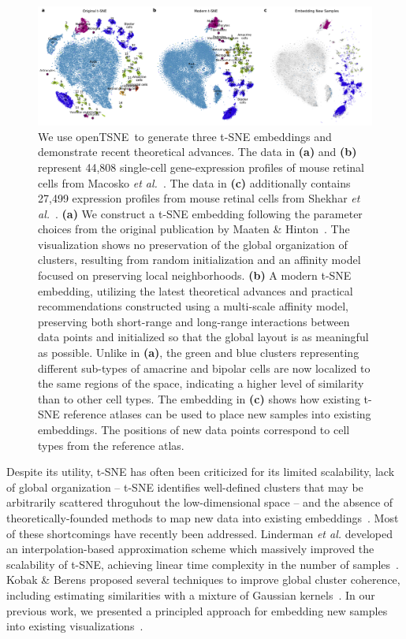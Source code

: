\documentclass[letter]{article}
\newcommand{\opentsne}{\textsf{openTSNE}}
\begin{document}
\begin{figure}[htbp]
  \includegraphics[width=\textwidth]{macosko2015}
  \caption{\label{fig:macosko}
  We use \opentsne\ to generate three t-SNE embeddings and demonstrate recent
  theoretical advances. The data in \textbf{(a)} and \textbf{(b)} represent 44,808
  single-cell gene-expression profiles of mouse retinal cells from Macosko
  \textit{et al.}~\cite{macosko2015highly}. The data in \textbf{(c)}
  additionally contains 27,499 expression profiles from mouse
  retinal cells from Shekhar \textit{et al.}~\cite{shekhar2016comprehensive}.
  \textbf{(a)} We construct a t-SNE
  embedding following the parameter choices from the original publication
  by Maaten \& Hinton~\cite{maaten2008visualizing}. The visualization
  shows no preservation of the global organization of clusters,
  resulting from random initialization and an affinity model focused on
  preserving local neighborhoods. \textbf{(b)} A modern t-SNE
  embedding, utilizing the latest theoretical advances and practical
  recommendations constructed using a multi-scale
  affinity model, preserving both short-range and long-range interactions
  between data points and initialized so that the global layout is
  as meaningful as possible. Unlike in \textbf{(a)}, the green and blue clusters
  representing different sub-types of amacrine and bipolar cells are now
  localized to the same regions of the space, indicating a higher level
  of similarity than to other cell types. The embedding in \textbf{(c)} shows how existing
  t-SNE reference atlases can be used to place new samples into existing
  embeddings. The positions of new data points correspond to cell types
  from the reference atlas.
}
\end{figure}

Despite its utility, t-SNE has often been criticized for its limited
scalability, lack of global organization -- t-SNE identifies well-defined clusters that
may be arbitrarily scattered throguhout the low-dimensional space -- and the absence of
theoretically-founded methods to map new data into existing
embeddings~\cite{ding2018interpretable,becht2019dimensionality}. Most of these
shortcomings have recently been addressed. Linderman \textit{et al.} developed
an interpolation-based approximation scheme which massively improved the
scalability of t-SNE, achieving linear time complexity
in the number of samples~\cite{linderman2019fast}. Kobak \& Berens proposed
several techniques to improve global cluster coherence, including estimating
similarities with a mixture of Gaussian kernels~\cite{kobak2019art}. In our
previous work, we presented a principled approach for embedding new samples into
existing visualizations~\cite{policar2019embedding}.
\end{document}
